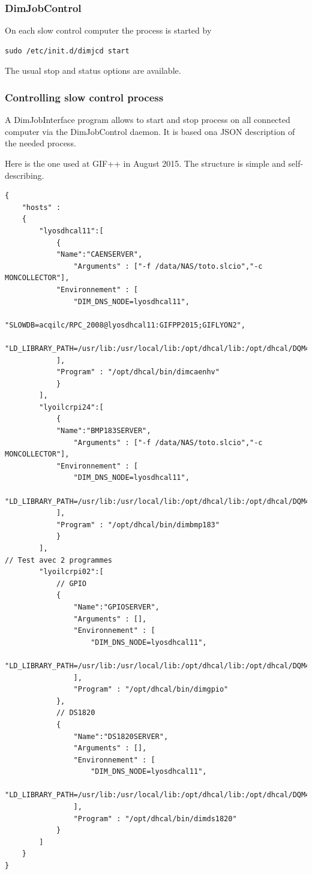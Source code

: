 \documentclass[english]{article}
\begin{document}
\subsubsection{DimJobControl}

On each slow control computer the process is started by
\begin{verbatim}
sudo /etc/init.d/dimjcd start
\end{verbatim}
The usual stop and status options are available.

\subsubsection{Controlling slow control process}

A DimJobInterface program allows to start and stop process on all connected computer via the DimJobControl daemon. It is based ona JSON description of the needed process.

Here is the one used at GIF++ in August 2015. The structure is simple and self-describing.


\begin{verbatim}
{
    "hosts" :
    {
        "lyosdhcal11":[
            {
            "Name":"CAENSERVER",
                "Arguments" : ["-f /data/NAS/toto.slcio","-c MONCOLLECTOR"],
            "Environnement" : [
                "DIM_DNS_NODE=lyosdhcal11",
                "SLOWDB=acqilc/RPC_2008@lyosdhcal11:GIFPP2015;GIFLYON2",
                "LD_LIBRARY_PATH=/usr/lib:/usr/local/lib:/opt/dhcal/lib:/opt/dhcal/DQM4HEP/lib:/opt/dhcal/dim/linux:$LD_LIBRARY_PATH"
            ],
            "Program" : "/opt/dhcal/bin/dimcaenhv"
            }         
        ],
        "lyoilcrpi24":[
            {
            "Name":"BMP183SERVER",
                "Arguments" : ["-f /data/NAS/toto.slcio","-c MONCOLLECTOR"],
            "Environnement" : [
                "DIM_DNS_NODE=lyosdhcal11",
                "LD_LIBRARY_PATH=/usr/lib:/usr/local/lib:/opt/dhcal/lib:/opt/dhcal/DQM4HEP/lib:/opt/dhcal/dim/linux:$LD_LIBRARY_PATH"
            ],
            "Program" : "/opt/dhcal/bin/dimbmp183"
            }         
        ],
// Test avec 2 programmes
        "lyoilcrpi02":[
            // GPIO
            {
                "Name":"GPIOSERVER",
                "Arguments" : [],
                "Environnement" : [
                    "DIM_DNS_NODE=lyosdhcal11",
                    "LD_LIBRARY_PATH=/usr/lib:/usr/local/lib:/opt/dhcal/lib:/opt/dhcal/DQM4HEP/lib:/opt/dhcal/dim/linux:$LD_LIBRARY_PATH"
                ],
                "Program" : "/opt/dhcal/bin/dimgpio"
            },
            // DS1820
            {
                "Name":"DS1820SERVER",
                "Arguments" : [],
                "Environnement" : [
                    "DIM_DNS_NODE=lyosdhcal11",
                    "LD_LIBRARY_PATH=/usr/lib:/usr/local/lib:/opt/dhcal/lib:/opt/dhcal/DQM4HEP/lib:/opt/dhcal/dim/linux:$LD_LIBRARY_PATH"
                ],
                "Program" : "/opt/dhcal/bin/dimds1820"
            }          
        ]
    }
}

\end{verbatim}
\end{document}
